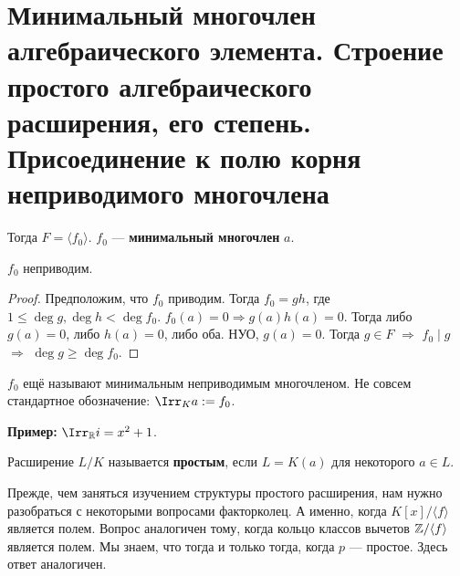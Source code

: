 \section{Минимальный многочлен алгебраического элемента. Строение простого алгебраического расширения, его степень. Присоединение к полю корня неприводимого многочлена}
\begin{conj}
    Тогда $F = \langle f_0 \rangle$. $f_0$ --- \textbf{минимальный многочлен} 
    $a$.
\end{conj}

\begin{lemma}
    $f_0$ неприводим.
\end{lemma}
\begin{proof}
    Предположим, что $f_0$ приводим. Тогда $f_0 = gh$, где $1 \leqslant \deg g, \deg h < \deg f_0$. $f_0(a) = 0 \Rightarrow g(a) h(a) = 0$. Тогда либо $g(a) = 0$, либо $h(a) = 0$, либо оба. НУО, $g(a) = 0$. Тогда $g \in F$ $\Rightarrow$ $f_0 \mid g$ $\Rightarrow$ $\deg g \geqslant \deg f_0$.
\end{proof}

\notice $f_0$ ещё называют минимальным неприводимым многочленом. 
Не совсем стандартное обозначение: $\Irr_K a := f_0$. 

\textbf{Пример:} $\Irr_\R i = x^2 + 1$.

\begin{conj}
    Расширение $L / K$ называется \textbf{простым}, если $L = K(a)$ для некоторого $a \in L$.
\end{conj}

Прежде, чем заняться изучением структуры простого расширения, нам нужно разобраться с некоторыми вопросами факторколец. А именно, когда $K[x] / \langle f \rangle$ является полем. Вопрос аналогичен тому, когда кольцо классов вычетов $\mathbb{Z} / \langle f \rangle$ является полем. Мы знаем, что тогда и только тогда, когда $p$ --- простое. Здесь ответ аналогичен.

